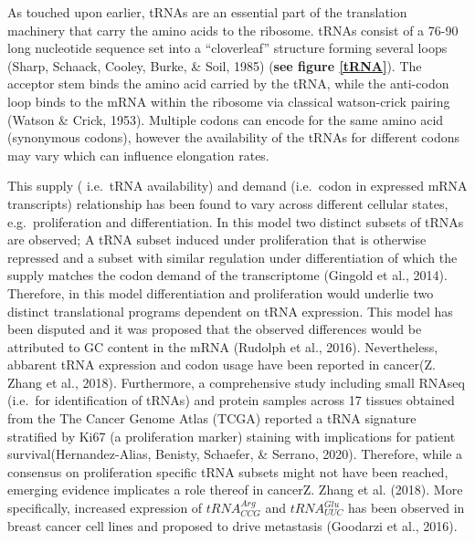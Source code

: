 \documentclass[
  12pt,
  openany]{book}
\begin{document}
As touched upon earlier, tRNAs are an essential part of the translation machinery that carry the amino acids to the ribosome. tRNAs consist of a 76-90 long nucleotide sequence set into a ``cloverleaf'' structure forming several loops (Sharp, Schaack, Cooley, Burke, \& Soil, 1985) (\textbf{see figure \ref{tRNA}}). The acceptor stem binds the amino acid carried by the tRNA, while the anti-codon loop binds to the mRNA within the ribosome via classical watson-crick pairing (Watson \& Crick, 1953). Multiple codons can encode for the same amino acid (synonymous codons), however the availability of the tRNAs for different codons may vary which can influence elongation rates.

This supply ( i.e.~tRNA availability) and demand (i.e.~codon in expressed mRNA transcripts) relationship has been found to vary across different cellular states, e.g.~proliferation and differentiation. In this model two distinct subsets of tRNAs are observed; A tRNA subset induced under proliferation that is otherwise repressed and a subset with similar regulation under differentiation of which the supply matches the codon demand of the transcriptome (Gingold et al., 2014). Therefore, in this model differentiation and proliferation would underlie two distinct translational programs dependent on tRNA expression. This model has been disputed and it was proposed that the observed differences would be attributed to GC content in the mRNA (Rudolph et al., 2016). Nevertheless, abbarent tRNA expression and codon usage have been reported in cancer(Z. Zhang et al., 2018). Furthermore, a comprehensive study including small RNAseq (i.e.~for identification of tRNAs) and protein samples across 17 tissues obtained from the The Cancer Genome Atlas (TCGA) reported a tRNA signature stratified by Ki67 (a proliferation marker) staining with implications for patient survival(Hernandez-Alias, Benisty, Schaefer, \& Serrano, 2020). Therefore, while a consensus on proliferation specific tRNA subsets might not have been reached, emerging evidence implicates a role thereof in cancerZ. Zhang et al. (2018). More specifically, increased expression of \(tRNA_{CCG}^{Arg}\) and \(tRNA_{UUC}^{Glu}\) has been observed in breast cancer cell lines and proposed to drive metastasis (Goodarzi et al., 2016).
\end{document}
